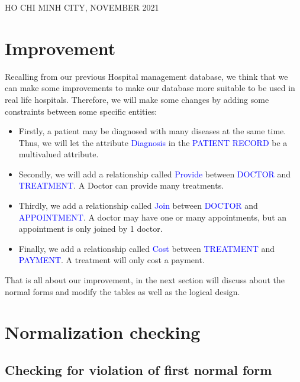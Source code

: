 \documentclass[a4paper]{article}
\numberwithin{equation}{section}
\begin{document}
\begin{titlepage}
  \begin{center}
    {\footnotesize \large HO CHI MINH CITY, NOVEMBER 2021}
  \end{center}
\end{titlepage}


\newpage
\tableofcontents
\newpage

\section{Improvement}
Recalling from our previous Hospital management database, we think that we can make some improvements to make our database more suitable to be used in real life hospitals. Therefore, we will make some changes by adding some constraints between some specific entities:

\begin{itemize}
  \item Firstly, a patient may be diagnosed with many diseases at the same time. Thus, we will let the attribute \textcolor{blue}{Diagnosis} in the \textcolor{blue}{PATIENT RECORD} be a multivalued attribute.
  \item Secondly, we will add a relationship called \textcolor{blue}{Provide} between \textcolor{blue}{DOCTOR} and \textcolor{blue}{TREATMENT}\@. A Doctor can provide many treatments.

  \item Thirdly, we add a relationship called \textcolor{blue}{Join} between \textcolor{blue}{DOCTOR} and \textcolor{blue}{APPOINTMENT}\@. A doctor may have one or many appointments, but an appointment is only joined by 1 doctor.
  \item Finally,  we add a relationship called \textcolor{blue}{Cost} between \textcolor{blue}{TREATMENT} and \textcolor{blue}{PAYMENT}\@. A treatment will only cost a payment.

\end{itemize}

That is all about our improvement, in the next section will discuss about the normal forms and modify the tables as well as the logical design.
\section{Normalization checking}
\subsection{Checking for violation of first normal form}
\end{document}
